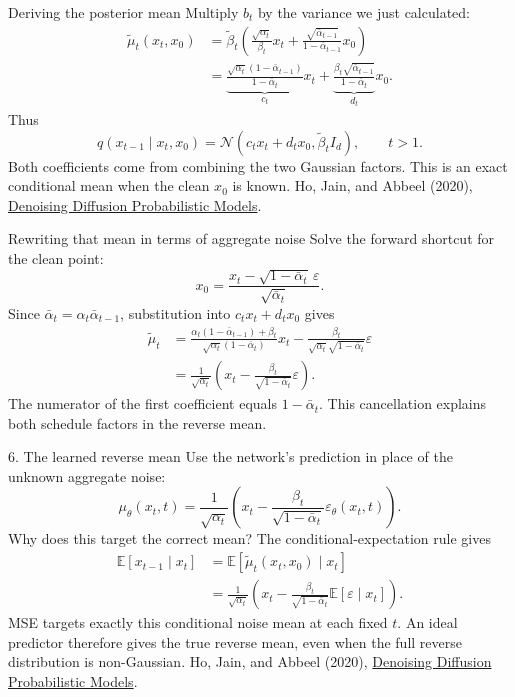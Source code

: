 \documentclass[aspectratio=169,11pt]{beamer}
\newcommand{\ddpmref}{\vfill{\tiny\color{gray}Ho, Jain, and Abbeel (2020), \href{https://arxiv.org/abs/2006.11239}{Denoising Diffusion Probabilistic Models}.}}
\begin{document}
\begin{frame}{Deriving the posterior mean}
Multiply $b_t$ by the variance we just calculated:
\begin{align*}
\tilde\mu_t(x_t,x_0)
&=\tilde\beta_t\left(
\frac{\sqrt{\alpha_t}}{\beta_t}x_t+
\frac{\sqrt{\bar\alpha_{t-1}}}{1-\bar\alpha_{t-1}}x_0\right)\\[3mm]
&=\underbrace{\frac{\sqrt{\alpha_t}(1-\bar\alpha_{t-1})}{1-\bar\alpha_t}}_{c_t}x_t
+\underbrace{\frac{\beta_t\sqrt{\bar\alpha_{t-1}}}{1-\bar\alpha_t}}_{d_t}x_0.
\end{align*}
Thus
\[q(x_{t-1}\mid x_t,x_0)=\mathcal N(c_tx_t+d_tx_0,\tilde\beta_t I_d),\qquad t>1.\]
Both coefficients come from combining the two Gaussian factors. This is an exact conditional mean when the clean $x_0$ is known.
\ddpmref
\end{frame}

\begin{frame}{Rewriting that mean in terms of aggregate noise}
Solve the forward shortcut for the clean point:
\[x_0=\frac{x_t-\sqrt{1-\bar\alpha_t}\,\varepsilon}{\sqrt{\bar\alpha_t}}.\]
Since $\bar\alpha_t=\alpha_t\bar\alpha_{t-1}$, substitution into $c_tx_t+d_tx_0$ gives
\begin{align*}
\tilde\mu_t
&=\frac{\alpha_t(1-\bar\alpha_{t-1})+\beta_t}
{\sqrt{\alpha_t}(1-\bar\alpha_t)}x_t
-\frac{\beta_t}{\sqrt{\alpha_t}\sqrt{1-\bar\alpha_t}}\varepsilon\\[3mm]
&=\boxed{\frac1{\sqrt{\alpha_t}}
\left(x_t-\frac{\beta_t}{\sqrt{1-\bar\alpha_t}}\varepsilon\right)}.
\end{align*}
The numerator of the first coefficient equals $1-\bar\alpha_t$. This cancellation explains both schedule factors in the reverse mean.
\end{frame}

\begin{frame}{6. The learned reverse mean}
Use the network's prediction in place of the unknown aggregate noise:
\[\boxed{\mu_\theta(x_t,t)=\frac{1}{\sqrt{\alpha_t}}
\left(x_t-\frac{\beta_t}{\sqrt{1-\bar\alpha_t}}\varepsilon_\theta(x_t,t)\right).}\]
Why does this target the correct mean? The conditional-expectation rule gives
\begin{align*}
\mathbb E[x_{t-1}\mid x_t]
&=\mathbb E[\tilde\mu_t(x_t,x_0)\mid x_t]\\[1mm]
&=\frac1{\sqrt{\alpha_t}}\left(x_t-
\frac{\beta_t}{\sqrt{1-\bar\alpha_t}}\mathbb E[\varepsilon\mid x_t]\right).
\end{align*}
MSE targets exactly this conditional noise mean at each fixed $t$. An ideal predictor therefore gives the true reverse mean, even when the full reverse distribution is non-Gaussian.
\ddpmref
\end{frame}
\end{document}
